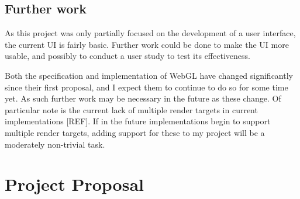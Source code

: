 \documentclass[12pt,twoside,notitlepage]{report}
\begin{document}
\section{Further work}
As this project was only partially focused on the development of a user interface, the current UI is fairly basic. Further work could be done to make the UI more usable, and possibly to conduct a user study to test its effectiveness.

Both the specification and implementation of WebGL have changed significantly since their first proposal, and I expect them to continue to do so for some time yet. As such further work may be necessary in the future as these change. Of particular note is the current lack of multiple render targets in current implementations [REF]. If in the future implementations begin to support multiple render targets, adding support for these to my project will be a moderately non-trivial task.

\cleardoublepage



\cleardoublepage

\appendix












\cleardoublepage

\chapter{Project Proposal}


\end{document}
